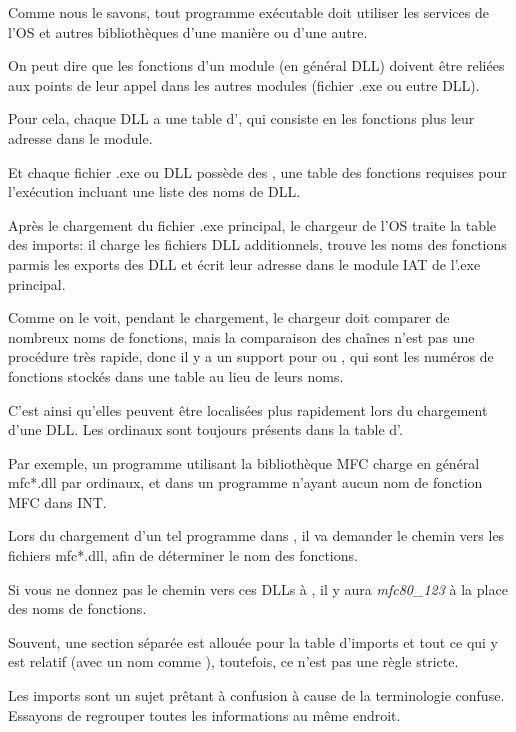 \label{PE_exports_imports}
Comme nous le savons, tout programme exécutable doit utiliser les services de l'\ac{OS}
et autres bibliothèques d'une manière ou d'une autre.

On peut dire que les fonctions d'un module (en général DLL) doivent être reliées
aux points de leur appel dans les autres modules (fichier .exe ou eutre DLL).

Pour cela, chaque DLL a une table d', qui consiste en les fonctions plus
leur adresse dans le module.

Et chaque fichier .exe ou DLL possède des , une table des fonctions requises
pour l'exécution incluant une liste des noms de DLL.

Après le chargement du fichier .exe principal, le chargeur de l'\ac{OS} traite la
table des imports: il charge les fichiers DLL additionnels, trouve les noms des fonctions
parmis les exports des DLL et écrit leur adresse dans le module \ac{IAT} de l'.exe
principal.


Comme on le voit, pendant le chargement, le chargeur doit comparer de nombreux noms
de fonctions, mais la comparaison des chaînes n'est pas une procédure très rapide,
donc il y a un support pour  ou , qui sont les numéros de fonctions
stockés dans une table au lieu de leurs noms.

C'est ainsi qu'elles peuvent être localisées plus rapidement lors du chargement d'une
DLL. Les ordinaux sont toujours présents dans la table d'.

Par exemple, un programme utilisant la bibliothèque \ac{MFC} charge en général mfc*.dll
par ordinaux, et dans un programme n'ayant aucun nom de fonction \ac{MFC} dans \ac{INT}.

Lors du chargement d'un tel programme dans \IDA, il va demander le chemin vers les
fichiers mfc*.dll, afin de déterminer le nom des fonctions.

Si vous ne donnez pas le chemin vers ces DLLs à \IDA, il y aura \emph{mfc80\_123} à
la place des noms de fonctions.


Souvent, une section séparée est allouée pour la table d'imports et tout ce qui y
est relatif (avec un nom comme ), toutefois, ce n'est pas une règle stricte.

Les imports sont un sujet prêtant à confusion à cause de la terminologie confuse.
Essayons de regrouper toutes les informations au même endroit.

